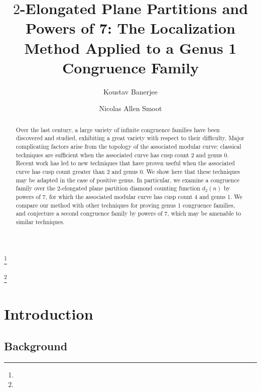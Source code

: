 \documentclass[reqno]{amsart}
\theoremstyle{definition}
\theoremstyle{remark}
\numberwithin{equation}{section}
\begin{document}
\title[$2$-Elongated Plane Partitions and Powers of 7]{$2$-Elongated Plane Partitions and Powers of 7: The Localization Method Applied to a Genus 1 Congruence Family}


\author{Koustav Banerjee}
\address{}
\curraddr{}
\email{}
\thanks{}

\author{Nicolas Allen Smoot}
\address{}
\curraddr{}
\email{}
\thanks{}




\date{}

\dedicatory{}

\begin{abstract}
Over the last century, a large variety of infinite congruence families have been discovered and studied, exhibiting a great variety with respect to their difficulty.  Major complicating factors arise from the topology of the associated modular curve: classical techniques are sufficient when the associated curve has cusp count 2 and genus 0.  Recent work has led to new techniques that have proven useful when the associated curve has cusp count greater than 2 and genus 0.  We show here that these techniques may be adapted in the case of positive genus.  In particular, we examine a congruence family over the 2-elongated plane partition diamond counting function $d_2(n)$ by powers of 7, for which the associated modular curve has cusp count 4 and genus 1.  We compare our method with other techniques for proving genus 1 congruence families, and conjecture a second congruence family by powers of 7, which may be amenable to similar techniques. 
\end{abstract}

\maketitle

\section{Introduction}

\subsection{Background}
\end{document}
